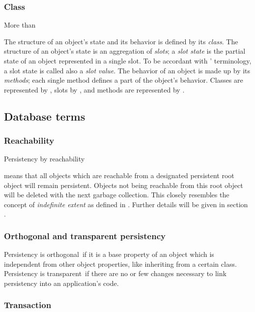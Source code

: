\subsubsection{Class}

\begin{fortune}[4cm]%
More than 
\end{fortune}%

The structure of an object's state and its behavior is defined by its
\emph{class}. The structure of an object's state is an aggregation of
\emph{slots}; a \emph{slot state} is the partial state of an object
represented in a single slot. To be accordant with \clos' terminology,
a slot state is called also a \emph{slot value}.  The behavior of an
object is made up by its \emph{methods}; each single method defines a
part of the object's behavior. Classes are represented by \clsmo[s],
slots by \sltmo[s], and methods are represented by \mtdmo[s].

\subsection{Database terms}

\subsubsection{Reachability}

\hypertarget{link:Reachability}{Persistency by reachability} means
that all objects which are reachable from a designated persistent root
object will remain persistent. Objects not being reachable from this
root object will be deleted with the next garbage collection. This
closely resembles the concept of \emph{indefinite extent} as defined
in .  Further details will be given in section
.

\subsubsection{Orthogonal and transparent persistency}

Persistency is \hypertarget{link:Orthogonal}{orthogonal}\ if it is a
base property of an object which is independent from other object
properties, like inheriting from a certain class. Persistency is
\hypertarget{link:Transparent}{transparent}\ if there are no or few
changes necessary to link persistency into an application's code.

\subsubsection{Transaction}


